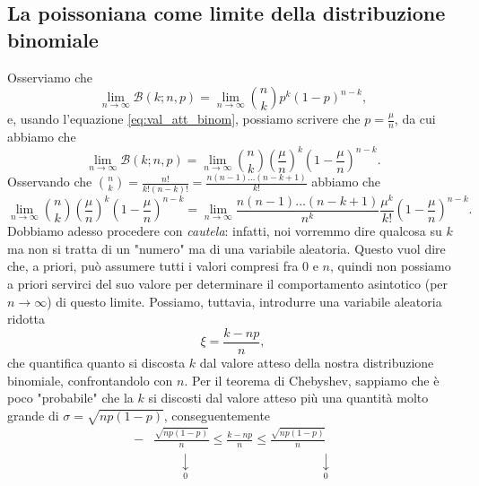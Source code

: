 \documentclass{report}
\begin{document}
\subsection{La poissoniana come limite della distribuzione binomiale}
\begin{myproof}
Osserviamo che
$$
\lim_{n \to \infty} \mathcal{B}(k; n, p) = \lim_{n \to \infty} \binom{n}{k} p^k (1-p)^{n-k},
$$
e, usando l'equazione \ref{eq:val_att_binom}, possiamo scrivere che $p = \frac{\mu}{n}$, da cui abbiamo che
$$
	\lim_{n \to \infty} \mathcal{B}(k; n, p) = \lim_{n \to \infty} \binom{n}{k} \left( \frac{\mu}{n} \right)^k \left( 1-\frac{\mu}{n} \right)^{n-k}.
$$
Osservando che $\binom{n}{k} = \frac{n!}{k!(n-k)!} = \frac{n(n-1) \ldots (n-k+1)}{k!}$ abbiamo che
$$
	\lim_{n \to \infty} \binom{n}{k} \left( \frac{\mu}{n} \right)^k \left( 1-\frac{\mu}{n} \right)^{n-k} = \lim_{n \to \infty} \frac{n(n-1)\ldots (n-k+1)}{n^k} \frac{\mu^k}{k!} \left( 1 - \frac{\mu}{n} \right)^{n-k}.
$$
Dobbiamo adesso procedere con \emph{cautela}: infatti, noi vorremmo dire qualcosa su $k$ ma non si tratta di un "numero" ma di una variabile aleatoria. Questo vuol dire che, a priori, può assumere tutti i valori compresi fra 0 e $n$, quindi non possiamo a priori servirci del suo valore per determinare il comportamento asintotico (per $n \to \infty$) di questo limite. Possiamo, tuttavia, introdurre una variabile aleatoria ridotta
\begin{equation}
	\xi = \frac{k - np}{n},
	\label{eq:xi_cas_rid}
\end{equation}
che quantifica quanto si discosta $k$ dal valore atteso della nostra distribuzione binomiale, confrontandolo con $n$. Per il teorema di Chebyshev, sappiamo che è poco "probabile" che la $k$ si discosti dal valore atteso più una quantità molto grande di $\sigma = \sqrt{np(1-p)}$, conseguentemente
\begin{align*}
    -&\frac{\sqrt{np(1-p)}}{n} \leq \frac{k - np}{n} \leq \frac{\sqrt{np(1-p)}}{n} \\
    &\, \, \, \, \, \, \, \, \, \, \, \, \underset{0}{\downarrow} \phantom{\leq} \phantom{\frac{k - np}{n}} \phantom{\leq} \, \, \, \, \, \, \, \, \, \, \, \, \, \, \, \, \, \, \, \, \, \, \, \, \, \, \, \, \, \, \, \, \underset{0}{\downarrow}

\end{align*}
\end{myproof}
\end{document}
